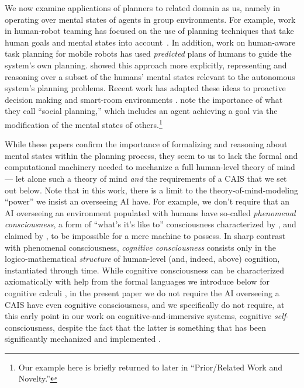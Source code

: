 We now examine applications of planners to related domain as us,
namely in operating over mental states of agents in group environments.
For example, work in human-robot teaming has focused on
the use of planning techniques that take human goals and
mental states into account~\cite{briggs_multi-modal_2012}.
In addition, work on human-aware task planning for mobile robots
\cite{cirillo_human-aware_2009} has used \emph{predicted} plans of humans to
guide the system's own planning.
\cite{talamadupula_coordination_2014,chakraborti_planning_2015} showed this
approach more explicitly, representing and reasoning over a subset
of the humans' mental states relevant to the autonomous system's planning
problems.
Recent work has adapted these ideas to proactive decision making
\cite{sengupta_radar_2017,kim_towards_2017} and smart-room environments
\cite{chakraborti_mr._2017}. \cite{pearce_etal_social_planning_aaai2014}
note the importance of what they call ``social planning,'' which
includes an agent achieving a goal via the modification of the mental
states of others.\footnote{Our example here is briefly returned
to later in ``Prior/Related Work and Novelty.''}

While these papers confirm the importance of formalizing and reasoning
about mental states within the planning process, they seem to us to lack the formal and
computational machinery needed to mechanize a full human-level theory
of mind --- let alone such a theory of mind \emph{and} the
requirements of a CAIS that we set out below. Note that in
this work, there is a limit to the theory-of-mind-modeling
``power'' we insist an overseeing AI have.  For example, we don't require
that an AI overseeing an environment populated with humans have
so-called \textit{phenomenal consciousness}, a form of ``what's it's
like to'' consciousness characterized by \cite{bbs.block}, and
claimed by \cite{sb_billion_conscious_robot}, to be impossible for a
mere machine to possess.  In sharp contrast with phenomenal
consciousness, \textit{cognitive consciousness} consists only in the
logico-mathematical \emph{structure} of human-level (and, indeed,
above) cognition, instantiated through time.  While cognitive
consciousness can be characterized axiomatically with help from the
formal languages we introduce below for cognitive calculi
\cite{axiomatizing_consciousness1}, in the present paper we do not
require the AI overseeing a CAIS have even cognitive consciousness,
and we specifically do not require, at this early point in our work
on cognitive-and-immersive systems, cognitive
\emph{self}-consciousness, despite the fact that the latter is
something that has been significantly mechanized and implemented
\cite{roman2015_robot_self-con,sb_on_knowledge_game}.